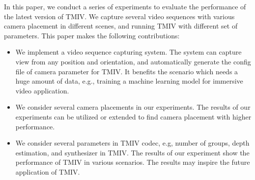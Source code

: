 In this paper, we conduct a series of experiments to evaluate the performance of the latest version of TMIV. We capture several video sequences with various camera placement in different scenes, and running TMIV with different set of parameters. 
This paper makes the following contributions:
\begin{itemize}
    \item We implement a video sequence capturing system. The system can capture view from any position and orientation, and automatically generate the config file of camera parameter for TMIV. It benefits the scenario which needs a huge amount of data, e.g., training a machine learning model for immersive video application. 
    \item We consider several camera placements in our experiments. The results of our experiments can be utilized or extended to find camera placement with higher performance.
    \item We consider several parameters in TMIV codec, e.g, number of groups, depth estimation, and synthesizer in TMIV. The results of our experiment show the performance of TMIV in various scenarios. The results may inspire the future application of TMIV.
\end{itemize}

